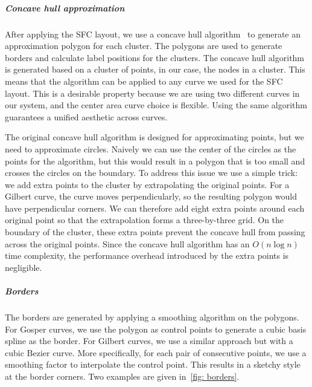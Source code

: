 \subparagraph{Concave hull approximation}
After applying the SFC layout, we use a concave hull algorithm~\cite{park2012concavehull} to generate an approximation polygon for each cluster.
The polygons are used to generate borders and calculate label positions for the clusters.
The concave hull algorithm is generated based on a cluster of points, in our case, the nodes in a cluster.
This means that the algorithm can be applied to any curve we used for the SFC layout.
This is a desirable property because we are using two different curves in our system, and the center area curve choice is flexible.
Using the same algorithm guarantees a unified aesthetic across curves.

The original concave hull algorithm is designed for approximating points, but we need to approximate circles.
Naively we can use the center of the circles as the points for the algorithm, but this would result in a polygon that is too small and crosses the circles on the boundary.
To address this issue we use a simple trick: we add extra points to the cluster by extrapolating the original points.
For a Gilbert curve, the curve moves perpendicularly, so the resulting polygon would have perpendicular corners. 
We can therefore add eight extra points around each original point so that the extrapolation forms a three-by-three grid.
On the boundary of the cluster, these extra points prevent the concave hull from passing across the original points.
Since the concave hull algorithm has an $O(n\log n)$ time complexity, the performance overhead introduced by the extra points is negligible.
\subparagraph{Borders} 
The borders are generated by applying a smoothing algorithm on the polygons.
For Gosper curves, we use the polygon as control points to generate a cubic basis spline as the border.
For Gilbert curves, we use a similar approach but with a cubic Bezier curve.
More specifically, for each pair of consecutive points, we use a smoothing factor to interpolate the control point.
This results in a sketchy style at the border corners.
Two examples are given in~\autoref{fig: borders}.

